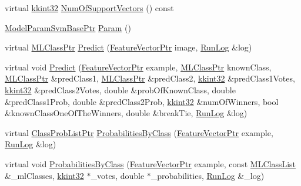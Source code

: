 \begin{DoxyCompactItemize}
\item 
virtual \hyperlink{namespace_k_k_b_a8fa4952cc84fda1de4bec1fbdd8d5b1b}{kkint32} \hyperlink{class_k_k_m_l_l_1_1_model_svm_base_a67e562216aae06c044ce1d16a0b37a5f}{Num\+Of\+Support\+Vectors} () const 
\item 
\hyperlink{namespace_k_k_m_l_l_a33c6027f2904ad96488db149ac30500c}{Model\+Param\+Svm\+Base\+Ptr} \hyperlink{class_k_k_m_l_l_1_1_model_svm_base_abd2354aeb663b020ca8b67c05f7dce6f}{Param} ()
\item 
virtual \hyperlink{namespace_k_k_m_l_l_ac272393853d59e72e8456f14cd6d8c23}{M\+L\+Class\+Ptr} \hyperlink{class_k_k_m_l_l_1_1_model_svm_base_a0f6f2bb16427e3136a2c67c0a26d439f}{Predict} (\hyperlink{namespace_k_k_m_l_l_a0c5df3d48f45926fbc4fee04f5e3bc04}{Feature\+Vector\+Ptr} image, \hyperlink{class_k_k_b_1_1_run_log}{Run\+Log} \&log)
\item 
virtual void \hyperlink{class_k_k_m_l_l_1_1_model_svm_base_afcd7990b5ca16cb75a89a65bb8006229}{Predict} (\hyperlink{namespace_k_k_m_l_l_a0c5df3d48f45926fbc4fee04f5e3bc04}{Feature\+Vector\+Ptr} example, \hyperlink{namespace_k_k_m_l_l_ac272393853d59e72e8456f14cd6d8c23}{M\+L\+Class\+Ptr} known\+Class, \hyperlink{namespace_k_k_m_l_l_ac272393853d59e72e8456f14cd6d8c23}{M\+L\+Class\+Ptr} \&pred\+Class1, \hyperlink{namespace_k_k_m_l_l_ac272393853d59e72e8456f14cd6d8c23}{M\+L\+Class\+Ptr} \&pred\+Class2, \hyperlink{namespace_k_k_b_a8fa4952cc84fda1de4bec1fbdd8d5b1b}{kkint32} \&pred\+Class1\+Votes, \hyperlink{namespace_k_k_b_a8fa4952cc84fda1de4bec1fbdd8d5b1b}{kkint32} \&pred\+Class2\+Votes, double \&prob\+Of\+Known\+Class, double \&pred\+Class1\+Prob, double \&pred\+Class2\+Prob, \hyperlink{namespace_k_k_b_a8fa4952cc84fda1de4bec1fbdd8d5b1b}{kkint32} \&num\+Of\+Winners, bool \&known\+Class\+One\+Of\+The\+Winners, double \&break\+Tie, \hyperlink{class_k_k_b_1_1_run_log}{Run\+Log} \&log)
\item 
virtual \hyperlink{namespace_k_k_m_l_l_a60f96a524ddb189eff2b4391cf0b651c}{Class\+Prob\+List\+Ptr} \hyperlink{class_k_k_m_l_l_1_1_model_svm_base_ac89efbfc18a12c050e7ef7620f667374}{Probabilities\+By\+Class} (\hyperlink{namespace_k_k_m_l_l_a0c5df3d48f45926fbc4fee04f5e3bc04}{Feature\+Vector\+Ptr} example, \hyperlink{class_k_k_b_1_1_run_log}{Run\+Log} \&log)
\item 
virtual void \hyperlink{class_k_k_m_l_l_1_1_model_svm_base_ab455a1aee8a6e0fc57af3504b556de50}{Probabilities\+By\+Class} (\hyperlink{namespace_k_k_m_l_l_a0c5df3d48f45926fbc4fee04f5e3bc04}{Feature\+Vector\+Ptr} example, const \hyperlink{class_k_k_m_l_l_1_1_m_l_class_list}{M\+L\+Class\+List} \&\+\_\+ml\+Classes, \hyperlink{namespace_k_k_b_a8fa4952cc84fda1de4bec1fbdd8d5b1b}{kkint32} $\ast$\+\_\+votes, double $\ast$\+\_\+probabilities, \hyperlink{class_k_k_b_1_1_run_log}{Run\+Log} \&\+\_\+log)

\end{DoxyCompactItemize}
